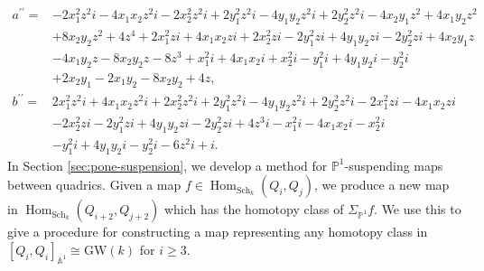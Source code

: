\documentclass[11pt,leqno]{article}
\renewcommand{\hom}{\operatorname{Hom}}
\newcommand{\A}{{\mathbb A}}
\newcommand{\pone}{{\mathbb P}^1}
\renewcommand{\1}{{\rm 1\hspace*{-0.4ex}%
\rule{0.1ex}{1.52ex}\hspace*{0.2ex}}}
\newcommand{\<}[1]{{\langle}#1 {\rangle}}
\theoremstyle{plain}
\theoremstyle{definition}
\theoremstyle{remark}
\numberwithin{equation}{section}
\begin{document}
\begin{align*}
a^{\prime\prime} =& -2x_1^2z^2i-4x_1x_2z^2i-2x_2^2z^2i+2y_1^2z^2i-4y_1y_2z^2i+2y_2^2z^2i-4x_2y_1z^2+4x_1y_2z^2\\
&+8x_2y_2z^2+4z^4+2x_1^2zi+4x_1x_2zi+2x_2^2zi-2y_1^2zi+4y_1y_2zi-2y_2^2zi+4x_2y_1z\\
&-4x_1y_2z-8x_2y_2z-8z^3+x_1^2i+4x_1x_2i+x_2^2i-y_1^2i+4y_1y_2i-y_2^2i\\
&+2x_2y_1-2x_1y_2-8x_2y_2+4z,\\
b^{\prime\prime} =& 2x_1^2z^2i+4x_1x_2z^2i+2x_2^2z^2i+2y_1^2z^2i-4y_1y_2z^2i+2y_2^2z^2i-2x_1^2zi-4x_1x_2zi\\
&-2x_2^2zi-2y_1^2zi+4y_1y_2zi-2y_2^2zi+4z^3i-x_1^2i-4x_1x_2i-x_2^2i\\
&-y_1^2i+4y_1y_2i-y_2^2i-6z^2i+i.
\end{align*}
In Section \ref{sec:pone-suspension}, we develop a method for $\pone$-suspending maps between quadrics. Given a map $f \in \hom_{\mathrm{Sch}_k}(Q_i, Q_j)$, we produce a new map in $\hom_{\mathrm{Sch}_k}(Q_{i+2}, Q_{j+2})$ which has the homotopy class of $\Sigma_{\pone}f$. We use this to give a procedure for constructing a map representing any homotopy class in $[Q_i,Q_i]_{\A^1} \cong \mathrm{GW}(k)$ for $i \geq3$.
\end{document}
